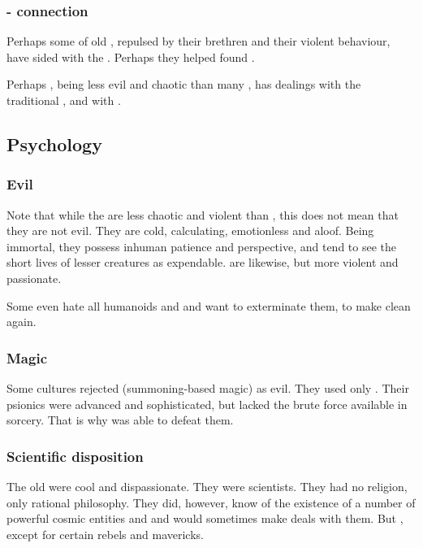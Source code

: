 \subsubsection{\Ophidian-\resphan{} connection}
Perhaps some of old \ophidians, repulsed by their \draconic{} brethren and their violent behaviour, have sided with the \resphain. Perhaps they helped found \Mystraacht. 

Perhaps \Ishna, being less evil and chaotic than many \dragons, has dealings with the traditional \ophidians{}, and with \Mystraacht. 









\subsection{Psychology}
\subsubsection{Evil}
Note that while the \ophidians{} are less chaotic and violent than \dragons, this does not mean that they are not evil. 
They are cold, calculating, emotionless and aloof. 
Being immortal, they possess inhuman patience and perspective, and tend to see the short lives of lesser creatures as expendable. 
\Dragons{} are likewise, but more violent and passionate. 


Some \trueophidians{} even hate all humanoids and \dragons{} and want to exterminate them, to make \Miith{} clean again.





\subsubsection{Magic}
Some \ophidian{} cultures rejected  (summoning-based magic) as evil. 
They used only . 
Their psionics were advanced and sophisticated, but lacked the brute force available in sorcery. 
That is why  was able to defeat them. 





\subsubsection{Scientific disposition}
The old \ophidians{} were cool and dispassionate. 
They were scientists. 
They had no religion, only rational philosophy. 
They did, however, know of the existence of a number of powerful cosmic entities and  and would sometimes make deals with them. 
But , except for certain rebels and mavericks. 

